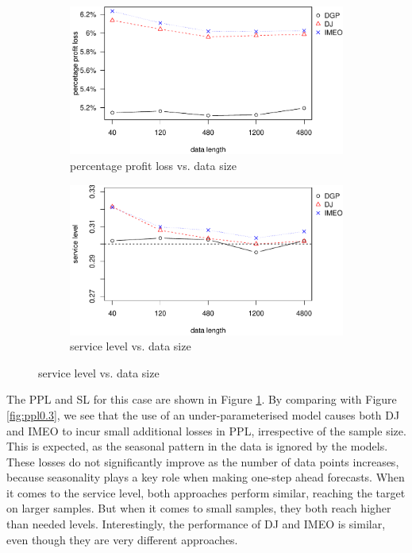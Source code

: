\documentclass{article}
\begin{document}
\begin{figure}[ht]
\centering
\caption{Performance vs. sample size with under-parameterised linear model}
\begin{subfigure}[b]{0.48\textwidth}
\centering
\includegraphics[width=\textwidth]{AR(1)ppl.pdf}
\caption{percentage profit loss vs. data size}
\end{subfigure}
\hfill
\begin{subfigure}[b]{0.48\textwidth}
\centering
\includegraphics[width=\textwidth]{AR(1)sl.pdf}
\caption{service level vs. data size}
\end{subfigure}
\label{fig:mis_under}
\end{figure}

The PPL and SL for this case are shown in Figure \ref{fig:mis_under}. By comparing with Figure \ref{fig:ppl0.3}, we see that the use of an under-parameterised model causes both DJ and IMEO to incur small additional losses in PPL, irrespective of the sample size. This is expected, as the seasonal pattern in the data is ignored by the models. These losses do not significantly improve as the number of data points increases, because seasonality plays a key role when making one-step ahead forecasts. When it comes to the service level, both approaches perform similar, reaching the target on larger samples. But when it comes to small samples, they both reach higher than needed levels. Interestingly, the performance of DJ and IMEO is similar, even though they are very different approaches.%
\end{document}
